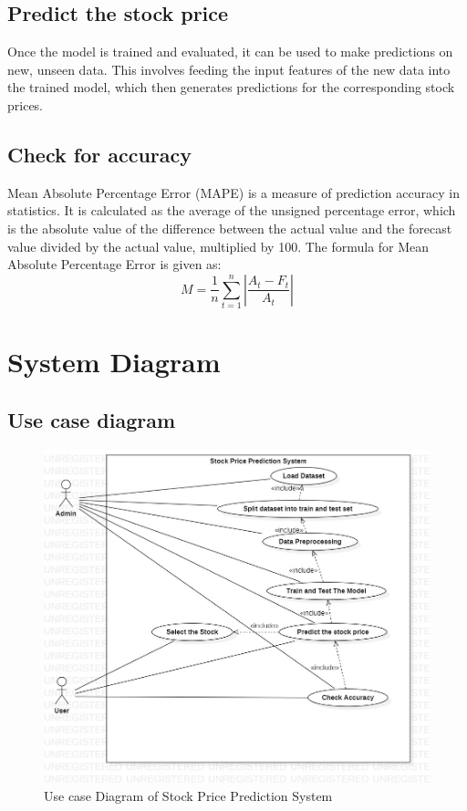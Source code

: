 \subsection{Predict the stock price}
\vspace{-18pt}
Once the model is trained and evaluated, it can be used to make predictions on new, unseen data. This involves feeding the input features of the new data into the trained model, which then generates predictions for the corresponding stock prices.
\subsection{Check for accuracy}
\vspace{-18pt}
Mean Absolute Percentage Error (MAPE) is a measure of prediction accuracy in statistics. It is calculated as the average of the unsigned percentage error, which is the absolute value of the difference between the actual value and the forecast value divided by the actual value, multiplied by 100. The formula for Mean Absolute Percentage Error is given as:
\begin{equation}
M = \frac{1}{n} \sum_{t=1}^{n} | \frac{A_t - F_t}{A_t}|
\end{equation}
\section{System Diagram}
\vspace{-18pt}
\subsection{Use case diagram}
\newpage 
\begin{figure}
	\includegraphics[width=6in]{images/ucd.jpg} 
	\caption{Use case Diagram of Stock Price Prediction System} %
	\label{Use case Diagram of Stock Price Prediction System} %
\end{figure}
\newpage
